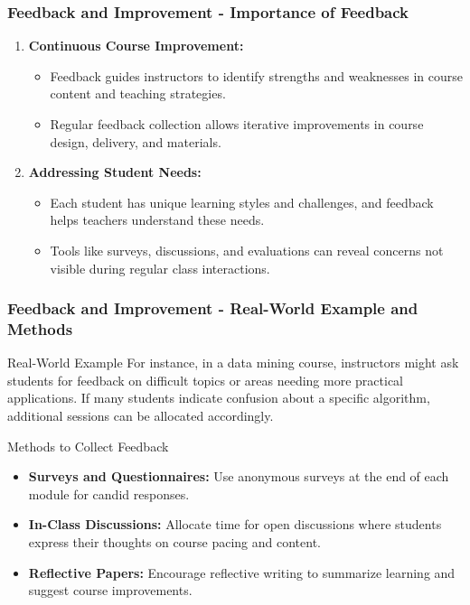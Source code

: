 \documentclass[aspectratio=169]{beamer}
\begin{document}
\begin{frame}[fragile]
    \frametitle{Feedback and Improvement - Importance of Feedback}
    \begin{enumerate}
        \item \textbf{Continuous Course Improvement:}
            \begin{itemize}
                \item Feedback guides instructors to identify strengths and weaknesses in course content and teaching strategies.
                \item Regular feedback collection allows iterative improvements in course design, delivery, and materials.
            \end{itemize}
        \item \textbf{Addressing Student Needs:}
            \begin{itemize}
                \item Each student has unique learning styles and challenges, and feedback helps teachers understand these needs.
                \item Tools like surveys, discussions, and evaluations can reveal concerns not visible during regular class interactions.
            \end{itemize}
    \end{enumerate}
\end{frame}

\begin{frame}[fragile]
    \frametitle{Feedback and Improvement - Real-World Example and Methods}
    \begin{block}{Real-World Example}
        For instance, in a data mining course, instructors might ask students for feedback on difficult topics or areas needing more practical applications. If many students indicate confusion about a specific algorithm, additional sessions can be allocated accordingly.
    \end{block}

    \begin{block}{Methods to Collect Feedback}
        \begin{itemize}
            \item \textbf{Surveys and Questionnaires:} Use anonymous surveys at the end of each module for candid responses.
            \item \textbf{In-Class Discussions:} Allocate time for open discussions where students express their thoughts on course pacing and content.
            \item \textbf{Reflective Papers:} Encourage reflective writing to summarize learning and suggest course improvements.
        \end{itemize}
    \end{block}
\end{frame}
\end{document}
